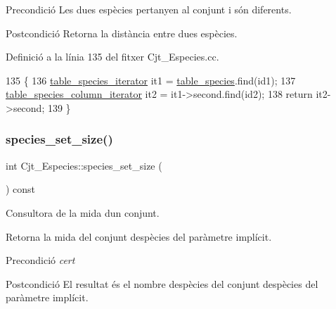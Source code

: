 \begin{DoxyPrecond}{Precondició}
Les dues espècies pertanyen al conjunt i són diferents. 
\end{DoxyPrecond}
\begin{DoxyPostcond}{Postcondició}
Retorna la distància entre dues espècies. 
\end{DoxyPostcond}


Definició a la línia 135 del fitxer Cjt\+\_\+\+Especies.\+cc.


\begin{DoxyCode}
135                                                                   \{
136     \hyperlink{class_cjt___especies_a5da209bb73685ff7a89041202bcdd8c7}{table\_species\_iterator} it1 = \hyperlink{class_cjt___especies_ae56d242080836b8d3db505f0a8623090}{table\_species}.find(id1);
137     \hyperlink{class_cjt___especies_a11316f4de57c3d78183137abe33b31c5}{table\_species\_column\_iterator} it2 = it1->second.find(id2);
138     \textcolor{keywordflow}{return} it2->second;
139 \}
\end{DoxyCode}
\mbox{\label{class_cjt___especies_a011e96e195dfe5997d42e7937fe2099c}} 
\subsubsection{\texorpdfstring{species\+\_\+set\+\_\+size()}{species\_set\_size()}}
{\footnotesize\ttfamily int Cjt\+\_\+\+Especies\+::species\+\_\+set\+\_\+size (\begin{DoxyParamCaption}{ }\end{DoxyParamCaption}) const}



Consultora de la mida d\textquotesingle{}un conjunt. 

Retorna la mida del conjunt d\textquotesingle{}espècies del paràmetre implícit.

\begin{DoxyPrecond}{Precondició}
{\itshape cert} 
\end{DoxyPrecond}
\begin{DoxyPostcond}{Postcondició}
El resultat és el nombre d\textquotesingle{}espècies del conjunt d\textquotesingle{}espècies del paràmetre implícit. 
\end{DoxyPostcond}


